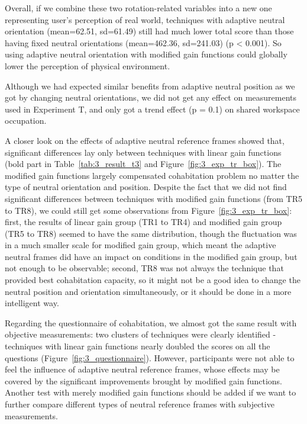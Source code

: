 Overall, if we combine these two rotation-related variables into a new one representing user's perception of real world, techniques with adaptive neutral orientation (mean=62.51, sd=61.49) still had much lower total score than those having fixed neutral orientations (mean=462.36, sd=241.03) (p \textless{} 0.001). So using adaptive neutral orientation with modified gain functions could globally lower the perception of physical environment.

Although we had expected similar benefits from adaptive neutral position as we got by changing neutral orientations, we did not get any effect on measurements used in Experiment T, and only got a trend effect (p = 0.1) on shared workspace occupation.

A closer look on the effects of adaptive neutral reference frames showed that, significant differences lay only between techniques with linear gain functions (bold part in Table~\ref{tab:3_result_t3} and Figure~\ref{fig:3_exp_tr_box}). The modified gain functions largely compensated cohabitation problem no matter the type of neutral orientation and position. Despite the fact that we did not find significant differences between techniques with modified gain functions (from TR5 to TR8), we could still get some observations from Figure~\ref{fig:3_exp_tr_box}: first, the results of linear gain group (TR1 to TR4) and modified gain group (TR5 to TR8) seemed to have the same distribution, though the fluctuation was in a much smaller scale for modified gain group, which meant the adaptive neutral frames did have an impact on conditions in the modified gain group, but not enough to be observable; second, TR8 was not always the technique that provided best cohabitation capacity, so it might not be a good idea to change the neutral position and orientation simultaneously, or it should be done in a more intelligent way.

Regarding the questionnaire of cohabitation, we almost got the same result with objective measurements: two clusters of techniques were clearly identified - techniques with linear gain functions nearly doubled the scores on all the questions (Figure~\ref{fig:3_questionnaire}). However, participants were not able to feel the influence of adaptive neutral reference frames, whose effects may be covered by the significant improvements brought by modified gain functions. Another test with merely modified gain functions should be added if we want to further compare different types of neutral reference frames with subjective measurements.

